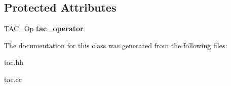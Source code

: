 \subsection*{Protected Attributes}
\begin{DoxyCompactItemize}
\item 
\mbox{\label{classTAC__Stmt_a81e978b2e0708d876daca7403bbab888}} 
T\+A\+C\+\_\+\+Op {\bfseries tac\+\_\+operator}
\end{DoxyCompactItemize}


The documentation for this class was generated from the following files\+:\begin{DoxyCompactItemize}
\item 
tac.\+hh\item 
tac.\+cc\end{DoxyCompactItemize}
